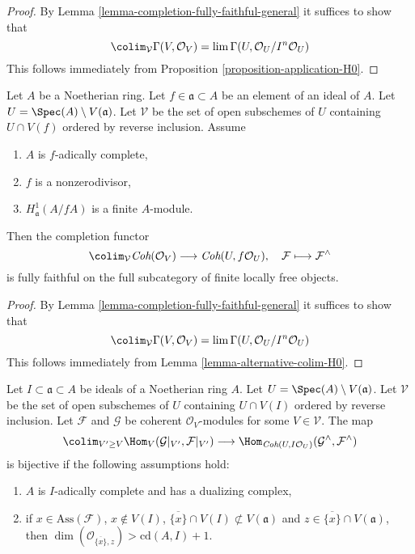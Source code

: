 \begin{proof}
By Lemma \ref{lemma-completion-fully-faithful-general}
it suffices to show that
$$
\colim_\mathcal{V} \Gamma(V, \mathcal{O}_V) =
\lim \Gamma(U, \mathcal{O}_U/I^n\mathcal{O}_U)
$$
This follows immediately from Proposition \ref{proposition-application-H0}.
\end{proof}

\begin{lemma}
\label{lemma-fully-faithful-general-alternative}
Let $A$ be a Noetherian ring. Let $f \in \mathfrak a \subset A$
be an element of an ideal of $A$. Let $U = \Spec(A) \setminus V(\mathfrak a)$.
Let $\mathcal{V}$ be the set of open subschemes of $U$ containing $U \cap V(f)$
ordered by reverse inclusion. Assume
\begin{enumerate}
\item $A$ is $f$-adically complete,
\item $f$ is a nonzerodivisor,
\item $H^1_\mathfrak a(A/fA)$ is a finite $A$-module.
\end{enumerate}
Then the completion functor
$$
\colim_\mathcal{V} \textit{Coh}(\mathcal{O}_V)
\longrightarrow
\textit{Coh}(U, f\mathcal{O}_U),
\quad
\mathcal{F} \longmapsto \mathcal{F}^\wedge
$$
is fully faithful on the full subcategory of finite locally free objects.
\end{lemma}

\begin{proof}
By Lemma \ref{lemma-completion-fully-faithful-general}
it suffices to show that
$$
\colim_\mathcal{V} \Gamma(V, \mathcal{O}_V) =
\lim \Gamma(U, \mathcal{O}_U/I^n\mathcal{O}_U)
$$
This follows immediately from Lemma \ref{lemma-alternative-colim-H0}.
\end{proof}

\begin{lemma}
\label{lemma-fully-faithful-very-general}
Let $I \subset \mathfrak a \subset A$ be ideals of a Noetherian ring $A$.
Let $U = \Spec(A) \setminus V(\mathfrak a)$. Let $\mathcal{V}$ be the set
of open subschemes of $U$ containing $U \cap V(I)$ ordered by reverse
inclusion. Let $\mathcal{F}$ and
$\mathcal{G}$ be coherent $\mathcal{O}_V$-modules for some
$V \in \mathcal{V}$. The map
$$
\colim_{V' \geq V} \Hom_V(\mathcal{G}|_{V'}, \mathcal{F}|_{V'})
\longrightarrow
\Hom_{\textit{Coh}(U, I\mathcal{O}_U)}(\mathcal{G}^\wedge, \mathcal{F}^\wedge)
$$
is bijective if the following assumptions hold:
\begin{enumerate}
\item $A$ is $I$-adically complete and has a dualizing complex,
\item if $x \in \text{Ass}(\mathcal{F})$, $x \not \in V(I)$,
$\overline{\{x\}} \cap V(I) \not \subset V(\mathfrak a)$
and $z \in \overline{\{x\}} \cap V(\mathfrak a)$, then
$\dim(\mathcal{O}_{\overline{\{x\}}, z}) > \text{cd}(A, I) + 1$.
\end{enumerate}
\end{lemma}

